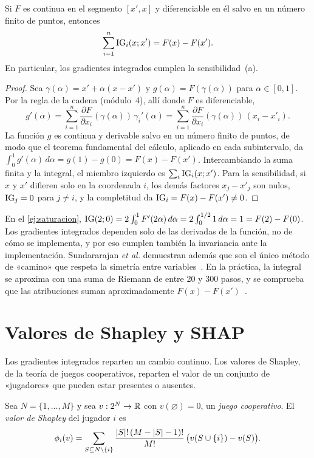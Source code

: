 \begin{proposicion}\label{prop:completitud}
Si $F$ es continua en el segmento $[x',x]$ y diferenciable en él salvo en un número finito de puntos, entonces
\[
\sum_{i=1}^{n}\operatorname{IG}_i(x;x')=F(x)-F(x').
\]
En particular, los gradientes integrados cumplen la sensibilidad~(a).
\end{proposicion}

\begin{proof}
Sea $\gamma(\alpha)=x'+\alpha(x-x')$ y $g(\alpha)=F(\gamma(\alpha))$ para $\alpha\in[0,1]$. Por la regla de la cadena (módulo~4), allí donde $F$ es diferenciable,
\[
g'(\alpha)=\sum_{i=1}^{n}\frac{\partial F}{\partial x_i}(\gamma(\alpha))\,\gamma_i'(\alpha)=\sum_{i=1}^{n}\frac{\partial F}{\partial x_i}(\gamma(\alpha))\,(x_i-x'_i).
\]
La función $g$ es continua y derivable salvo en un número finito de puntos, de modo que el teorema fundamental del cálculo, aplicado en cada subintervalo, da $\int_0^1g'(\alpha)\,d\alpha=g(1)-g(0)=F(x)-F(x')$. Intercambiando la suma finita y la integral, el miembro izquierdo es $\sum_i\operatorname{IG}_i(x;x')$. Para la sensibilidad, si $x$ y $x'$ difieren solo en la coordenada $i$, los demás factores $x_j-x'_j$ son nulos, $\operatorname{IG}_j=0$ para $j\neq i$, y la completitud da $\operatorname{IG}_i=F(x)-F(x')\neq 0$.
\end{proof}

En el \cref{ej:saturacion}, $\operatorname{IG}(2;0)=2\int_0^1F'(2\alpha)\,d\alpha=2\int_0^{1/2}1\,d\alpha=1=F(2)-F(0)$. Los gradientes integrados dependen solo de las derivadas de la función, no de cómo se implementa, y por eso cumplen también la invariancia ante la implementación. Sundararajan \emph{et al.} demuestran además que son el único método de «camino» que respeta la simetría entre variables~\cite[§4.2, teorema~1]{sundararajan}. En la práctica, la integral se aproxima con una suma de Riemann de entre 20 y 300 pasos, y se comprueba que las atribuciones suman aproximadamente $F(x)-F(x')$~\cite[§5]{sundararajan}.

\section{Valores de Shapley y SHAP}

Los gradientes integrados reparten un cambio continuo. Los valores de Shapley, de la teoría de juegos cooperativos, reparten el valor de un conjunto de «jugadores» que pueden estar presentes o ausentes.

\begin{definicion}\label{def:shapley}
Sea $N=\{1,\dots,M\}$ y sea $v:2^{N}\to\mathbb{R}$ con $v(\varnothing)=0$, un \emph{juego cooperativo}. El \emph{valor de Shapley} del jugador $i$ es
\[
\phi_i(v)=\sum_{S\subseteq N\setminus\{i\}}\frac{\lvert S\rvert!\,(M-\lvert S\rvert-1)!}{M!}\,\bigl(v(S\cup\{i\})-v(S)\bigr).
\]
\end{definicion}

